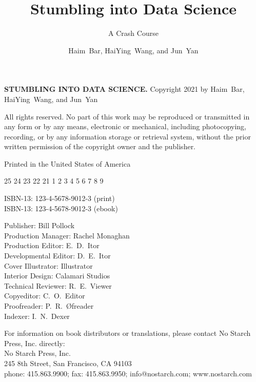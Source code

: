 \author{Haim~Bar, HaiYing~Wang, and Jun~Yan}

\title{Stumbling into Data Science}

\subtitle{A Crash Course}


\makehalftitle

\maketitle


\begin{copyrightpage}
  \textbf{\sffamily\MakeUppercase{Stumbling into Data Science.}}
  Copyright \textcopyright{} 2021 by
  Haim~Bar, HaiYing~Wang, and Jun~Yan
  
  All rights reserved. No part of this work may be reproduced or
  transmitted in any form or by any means, electronic or mechanical,
  including photocopying, recording, or by any information storage or
  retrieval system, without the prior written permission of the
  copyright owner and the publisher.

Printed in the United States of America

25 24 23 22 21 \hspace{0.5in}  1 2 3 4 5 6 7 8 9

ISBN-13: 123-4-5678-9012-3 (print)\\
ISBN-13: 123-4-5678-9012-3 (ebook)

Publisher: Bill Pollock\\
Production Manager: Rachel Monaghan\\
Production Editor: E.~D.~Itor\\
Developmental Editor: D.~E.~Itor\\
Cover Illustrator: Illustrator\\
Interior Design: Calamari Studios\\
Technical Reviewer: R.~E.~Viewer\\
Copyeditor: C.~O.~Editor\\
Proofreader: P.~R.~\O freader\\
Indexer: I.~N.~Dexer

For information on book distributors or translations, please contact
No Starch Press, Inc. directly: \\
No Starch Press, Inc.\\
245 8th Street, San Francisco, CA 94103\\
phone: 415.863.9900; fax: 415.863.9950; info@nostarch.com; www.nostarch.com\\


\end{copyrightpage}
